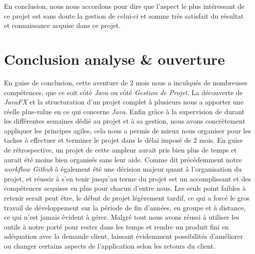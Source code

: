 \documentclass[a4paper,french,final]{memoir}
\begin{document}
En conclusion, nous nous accordons pour dire que l'aspect le plus intéressant de ce projet est sans doute la gestion de celui-ci et somme très satisfait du résultat et connaissance acquise dans ce projet.

\chapter{Conclusion analyse \& ouverture}
En guise de conclusion, cette aventure de 2 mois nous a inculqués de nombreuses compétences, que ce soit côté \emph{Java} ou côté \emph{Gestion de Projet}.
La découverte de \emph{JavaFX} et la structuration d'un projet complet à plusieurs nous a apporter une réelle plus-value en ce qui concerne \emph{Java}. Enfin grâce à la supervision de \thesupervisor \space durant les différentes semaines dédié au projet et à sa gestion, nous avons concrètement appliquer les principes agiles, cela nous a permis de mieux nous organiser pour les taches à effectuer et terminer le projet dans le délai imposé de 2 mois.
En guise de rétrospective, un projet de cette ampleur aurait pris bien plus de temps et aurait été moins bien organisés sans leur aide.
Comme dit précédemment notre \emph{workflow Github} à également été une décision majeur quant à l'organisation du projet, et réussir à s'en tenir jusqu'au terme du projet est un accomplissant et des compétences acquises en plus pour chacun d'entre nous.
Les seuls point faibles à retenir serait peut être, le début de projet légèrement tardif, ce qui a forcé le gros travail de développement sur la période de fin d'années, en groupe et à distance, ce qui n'est jamais évident à gérer.
Malgré tout nous avons réussi à utiliser les outils à notre porté pour rester dans les temps et rendre un produit fini en adéquation avec la demande client, laissant évidemment possibilités d'améliorer ou changer certains aspects de l'application selon les retours du client.
\end{document}
